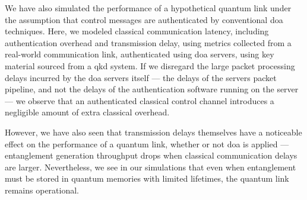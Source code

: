 We have also simulated the performance of a hypothetical quantum link under the assumption that
control messages are authenticated by conventional \acrshort{doa} techniques. Here, we modeled
classical communication latency, including authentication overhead and transmission delay, using
metrics collected from a real-world communication link, authenticated using \acrshort{doa} servers,
using key material sourced from a \acrshort{qkd} system. If we disregard the large packet processing
delays incurred by the \acrshort{doa} servers itself --- the delays of the servers packet pipeline,
and not the delays of the authentication software running on the server --- we observe that an
authenticated classical control channel introduces a negligible amount of extra classical overhead.

However, we have also seen that transmission delays themselves have a noticeable effect on the
performance of a quantum link, whether or not \acrlong{doa} is applied --- entanglement generation
throughput drops when classical communication delays are larger. Nevertheless, we see in our
simulations that even when entanglement must be stored in quantum memories with limited lifetimes,
the quantum link remains operational.

\begin{xstretch}
\printbibliography[heading=subbibintoc,title={References},notcategory=noprint]
\end{xstretch}

